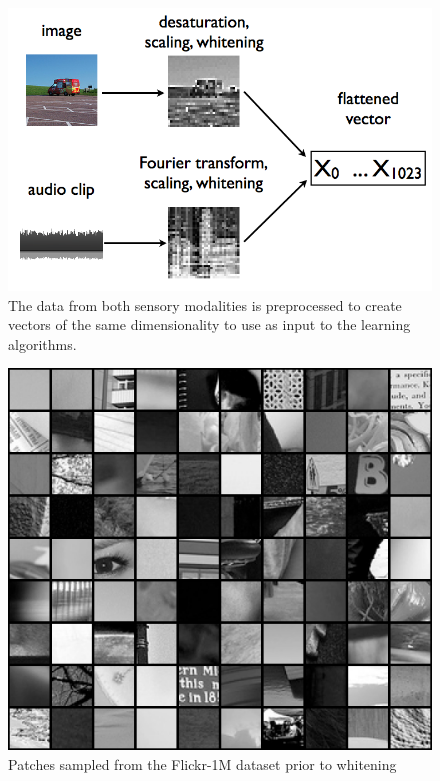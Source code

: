 \documentclass[12pt]{article}
\begin{document}
\begin{doublespacing}
\begin{figure}[p]
\centering
\includegraphics[width=6in]{key1002}
\caption{The data from both sensory modalities is preprocessed to create vectors of the same dimensionality to use as input to the learning algorithms.}
\end{figure}

\begin{figure}[p]
\centering
\includegraphics[width=6in]{patch_arrangment}
\caption{Patches sampled from the Flickr-1M dataset prior to whitening}
\end{figure}
	

\end{doublespacing}
\end{document}
